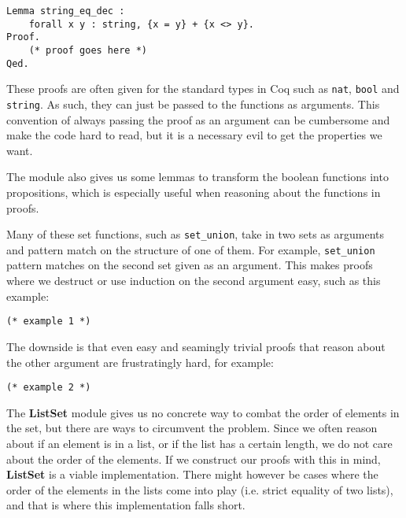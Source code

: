 \begin{minipage}{\linewidth}
\begin{lstlisting}[language=Coq, label={lst:string_eq_dec}, caption={Decidability proof for string equality in Coq}]
Lemma string_eq_dec :
    forall x y : string, {x = y} + {x <> y}.
Proof.
    (* proof goes here *)
Qed.
\end{lstlisting}
\end{minipage}

These proofs are often given for the standard types in Coq such as \lstinline{nat},
\lstinline{bool} and \lstinline{string}.
As such, they can just be passed to the functions as arguments.
This convention of always passing the proof as an argument can be cumbersome and make the code hard to read,
but it is a necessary evil to get the properties we want.

The module also gives us some lemmas to transform the boolean functions into propositions,
which is especially useful when reasoning about the functions in proofs.

Many of these set functions, such as \lstinline{set_union},
take in two sets as arguments and pattern match on the structure of one of them.
For example, \lstinline{set_union} pattern matches on the second set given as an argument.
This makes proofs where we destruct or use induction on the second argument easy, such as this example:

\begin{minipage}{\linewidth}
\begin{lstlisting}[language=Coq, label={lst:set_op_ex1}, caption={Easy proof of lemma in \lstinline{ListSet}}]
(* example 1 *)
\end{lstlisting}
\end{minipage}

The downside is that even easy and seamingly trivial proofs that reason about the other argument are frustratingly hard,
for example:

\begin{minipage}{\linewidth}
\begin{lstlisting}[language=Coq, label={lst:set_op_ex2}, caption={Hard proof of lemma in \lstinline{ListSet}}]
(* example 2 *)
\end{lstlisting}
\end{minipage}

The \textbf{ListSet} module gives us no concrete way to combat the order of elements in the set,
but there are ways to circumvent the problem.
Since we often reason about if an element is in a list, or if the list has a certain length,
we do not care about the order of the elements.
If we construct our proofs with this in mind, \textbf{ListSet} is a viable implementation.
There might however be cases where the order of the elements in the lists come into play (i.e. strict equality of two lists),
and that is where this implementation falls short.

